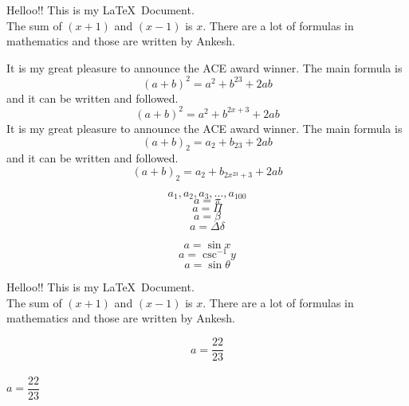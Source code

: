 \documentclass[11pt]{article}
\begin{document}
Helloo!! This is my \LaTeX\ Document.\\
The sum of $(x+1)$ and $(x-1)$ is $x$. There are a lot of formulas in mathematics and those are written by Ankesh.

It is my great pleasure to announce the ACE award winner. The main formula is $$(a+b)^2 = a^2 + b^{23} + 2ab$$ and it can be written and followed.
$$(a+b)^2 = a^2 + b^{2x+3} + 2ab$$
It is my great pleasure to announce the ACE award winner. The main formula is $$(a+b)_2 = a_2 + b_{23} + 2ab$$ and it can be written and followed.
$$(a+b)_2 = a_2 + b_{2x^{23}+3} + 2ab$$

$$a_1, a_2, a_3, \dots,a_{100}$$
$$a = \pi$$
$$a = \Pi$$
$$a = \beta$$
$$a = \Delta \delta$$

$$a = \sin x$$
$$a = \csc^{-1} y$$
$$a = \sin \theta$$

Helloo!! This is my \LaTeX\ Document.\\[10pt]
The sum of $(x+1)$ and $(x-1)$ is $x$. There are a lot of formulas in mathematics and those are written by Ankesh.

$$a=\frac{22}{23}$$ \\[6pt]
$a=\dfrac{22}{23}$
\end{document}
